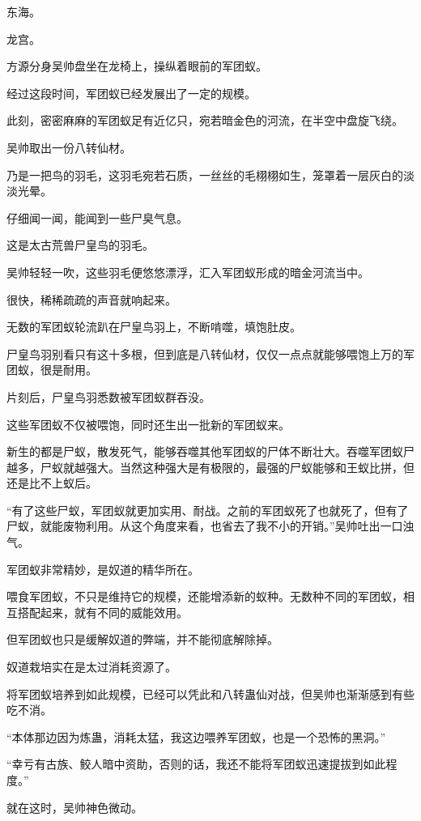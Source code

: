
\begin{this_body}

东海。

龙宫。

方源分身吴帅盘坐在龙椅上，操纵着眼前的军团蚁。

经过这段时间，军团蚁已经发展出了一定的规模。

此刻，密密麻麻的军团蚁足有近亿只，宛若暗金色的河流，在半空中盘旋飞绕。

吴帅取出一份八转仙材。

乃是一把鸟的羽毛，这羽毛宛若石质，一丝丝的毛栩栩如生，笼罩着一层灰白的淡淡光晕。

仔细闻一闻，能闻到一些尸臭气息。

这是太古荒兽尸皇鸟的羽毛。

吴帅轻轻一吹，这些羽毛便悠悠漂浮，汇入军团蚁形成的暗金河流当中。

很快，稀稀疏疏的声音就响起来。

无数的军团蚁轮流趴在尸皇鸟羽上，不断啃噬，填饱肚皮。

尸皇鸟羽别看只有这十多根，但到底是八转仙材，仅仅一点点就能够喂饱上万的军团蚁，很是耐用。

片刻后，尸皇鸟羽悉数被军团蚁群吞没。

这些军团蚁不仅被喂饱，同时还生出一批新的军团蚁来。

新生的都是尸蚁，散发死气，能够吞噬其他军团蚁的尸体不断壮大。吞噬军团蚁尸越多，尸蚁就越强大。当然这种强大是有极限的，最强的尸蚁能够和王蚁比拼，但还是比不上蚁后。

“有了这些尸蚁，军团蚁就更加实用、耐战。之前的军团蚁死了也就死了，但有了尸蚁，就能废物利用。从这个角度来看，也省去了我不小的开销。”吴帅吐出一口浊气。

军团蚁非常精妙，是奴道的精华所在。

喂食军团蚁，不只是维持它的规模，还能增添新的蚁种。无数种不同的军团蚁，相互搭配起来，就有不同的威能效用。

但军团蚁也只是缓解奴道的弊端，并不能彻底解除掉。

奴道栽培实在是太过消耗资源了。

将军团蚁培养到如此规模，已经可以凭此和八转蛊仙对战，但吴帅也渐渐感到有些吃不消。

“本体那边因为炼蛊，消耗太猛，我这边喂养军团蚁，也是一个恐怖的黑洞。”

“幸亏有古族、鲛人暗中资助，否则的话，我还不能将军团蚁迅速提拔到如此程度。”

就在这时，吴帅神色微动。


\end{this_body}
